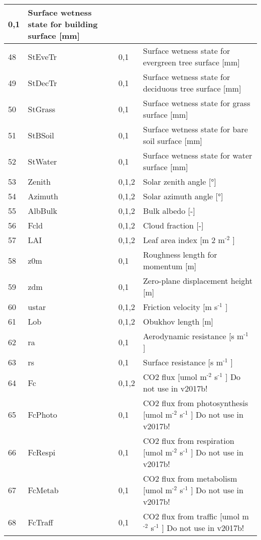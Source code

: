 \documentclass[letterpaper,10pt,english]{sphinxmanual}
\begin{document}
\begin{savenotes}
\begin{longtable}{|l|l|l|l|}
0,1
&
Surface wetness state for building surface {[}mm{]}
\\
\hline
48
&
StEveTr
&
0,1
&
Surface wetness state for evergreen tree surface {[}mm{]}
\\
\hline
49
&
StDecTr
&
0,1
&
Surface wetness state for deciduous tree surface {[}mm{]}
\\
\hline
50
&
StGrass
&
0,1
&
Surface wetness state for grass surface {[}mm{]}
\\
\hline
51
&
StBSoil
&
0,1
&
Surface wetness state for bare soil surface {[}mm{]}
\\
\hline
52
&
StWater
&
0,1
&
Surface wetness state for water surface {[}mm{]}
\\
\hline
53
&
Zenith
&
0,1,2
&
Solar zenith angle {[}°{]}
\\
\hline
54
&
Azimuth
&
0,1,2
&
Solar azimuth angle {[}°{]}
\\
\hline
55
&
AlbBulk
&
0,1,2
&
Bulk albedo {[}-{]}
\\
\hline
56
&
Fcld
&
0,1,2
&
Cloud fraction {[}-{]}
\\
\hline
57
&
LAI
&
0,1,2
&
Leaf area index {[}m 2 m$^{\text{-2}}$ {]}
\\
\hline
58
&
z0m
&
0,1
&
Roughness length for momentum {[}m{]}
\\
\hline
59
&
zdm
&
0,1
&
Zero-plane displacement height {[}m{]}
\\
\hline
60
&
ustar
&
0,1,2
&
Friction velocity {[}m s$^{\text{-1}}$ {]}
\\
\hline
61
&
Lob
&
0,1,2
&
Obukhov length {[}m{]}
\\
\hline
62
&
ra
&
0,1
&
Aerodynamic resistance {[}s m$^{\text{-1}}$ {]}
\\
\hline
63
&
rs
&
0,1
&
Surface resistance {[}s m$^{\text{-1}}$ {]}
\\
\hline
64
&
Fc
&
0,1,2
&
CO2 flux {[}umol m$^{\text{-2}}$ s$^{\text{-1}}$ {]} Do not use in v2017b!
\\
\hline
65
&
FcPhoto
&
0,1
&
CO2 flux from photosynthesis {[}umol m$^{\text{-2}}$ s$^{\text{-1}}$ {]} Do not use in v2017b!
\\
\hline
66
&
FcRespi
&
0,1
&
CO2 flux from respiration {[}umol m$^{\text{-2}}$ s$^{\text{-1}}$ {]} Do not use in v2017b!
\\
\hline
67
&
FcMetab
&
0,1
&
CO2 flux from metabolism {[}umol m$^{\text{-2}}$ s$^{\text{-1}}$ {]} Do not use in v2017b!
\\
\hline
68
&
FcTraff
&
0,1
&
CO2 flux from traffic {[}umol m$^{\text{-2}}$ s$^{\text{-1}}$ {]} Do not use in v2017b!

\end{longtable}
\end{savenotes}
\end{document}
